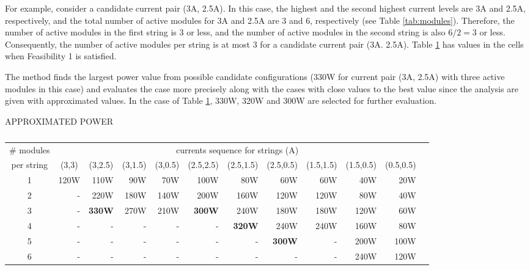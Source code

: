 \documentclass[conference]{pvsctran}
\begin{document}
For example, consider a candidate current pair (3A, 2.5A). In this case, the highest and the second highest current levels are 3A and 2.5A, respectively, and the total number of active modules for 3A and 2.5A are 3 and 6, respectively (see Table \ref{tab:modules}). Therefore, the number of active modules in the first string is 3 or less, and the number of active modules in the second string is also $ 6/2  = 3$ or less. Consequently, the number of active modules per string is at most 3 for a candidate current pair (3A. 2.5A). Table \ref{tab:powers} has values in the cells when Feasibility 1 is satisfied. 

The method finds the largest power value from possible candidate configurations (330W for current pair (3A, 2.5A) with three active modules in this case) and evaluates the case more precisely along with the cases with close values to the best value since the analysis are given with approximated values. In the case of Table \ref{tab:powers}, 330W, 320W and 300W are selected for further evaluation. 


\begin{table}[t]
  \caption{}
  \centerline{APPROXIMATED POWER}
  \vskip5pt
\label{tab:powers}
\centering
\begin{tabular}{c|rrrrrrrrrrr}
\hline\hline	
\# modules & 	\multicolumn{10}{c}{currents sequence for strings (A)} \\ 																
per string		&	\multicolumn{1}{c}{(3,3)}	&	\multicolumn{1}{c}{(3,2.5)}	&	\multicolumn{1}{c}{(3,1.5)}	&	\multicolumn{1}{c}{(3,0.5)}	&	\multicolumn{1}{c}{(2.5,2.5)}	&	\multicolumn{1}{c}{(2.5,1.5)}	&	\multicolumn{1}{c}{(2.5,0.5)}	&	\multicolumn{1}{c}{(1.5,1.5)}	&	\multicolumn{1}{c}{(1.5,0.5)}	&	\multicolumn{1}{c}{(0.5,0.5)}	\\ \hline
	1	&	120W	&	110W	&	90W	&	70W	&	100W	&	80W	&	60W	&	60W	&	40W	&	20W	\\ \hline
	2	&	-	&	220W	&	180W	&	140W	&	200W	&	160W	&	120W	&	120W	&	80W	&	40W	\\ \hline	3	&	-	&\textbf{330W}&	270W	&	210W	&	\textbf{300W}	&	240W	&	180W	&	180W	&	120W	&	60W	\\ \hline
4	&	-	&	-	&	-	&	-	&	-	&	\textbf{320W}	&	240W	&	240W	&	160W	&	80W	\\ \hline
	 5	&	-	&	-	&	-	&	-	&	-	&	-	&	\textbf{300W}	&	-	&	200W	&	100W	\\ \hline
	6	&	-	&	-	&	-	&	-	&	-	&	-	&	-	&	-	&	240W	&	120W	\\ \hline
\end{tabular}
\end{table}
\end{document}
